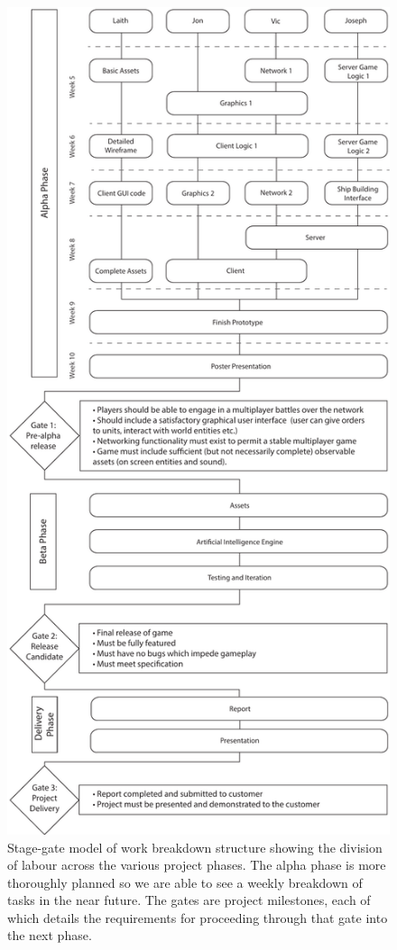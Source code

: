 \begin{figure}
	\label{stage_gate}
	\includegraphics{res/stage_gate_diagram}
	\caption{Stage-gate model of work breakdown structure showing the division of labour across the various project phases. 
	The alpha phase is more thoroughly planned so we are able to see a weekly breakdown of tasks in the near future. The gates are project milestones, each of which details the requirements for proceeding through that gate into the next phase.}
\end{figure}
